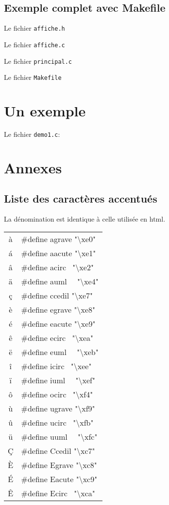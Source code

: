 \documentclass{report}
\newcommand\code[1]{
\begin{mdframed}[linecolor=purple,backgroundcolor=blue!10]
{\tt
#1
}
\end{mdframed}
}
\begin{document}
\section{Exemple complet avec Makefile}
Le fichier \texttt{affiche.h} \code{  }

Le fichier \texttt{affiche.c} \code{  }

Le fichier \texttt{principal.c} \code{  }

Le fichier \texttt{Makefile} \code{  }

\chapter{Un exemple}
Le fichier \texttt{demo1.c}:
\code{

}

\newcommand\letac[2]{\#define #1 "\textbackslash #2"\\}
\newcommand\letacfin[2]{\#define #1 "\textbackslash #2"}

\appendix
\chapter{Annexes}
\section{Liste des caractères accentués}
La dénomination est identique à celle utilisée en html.
\code{
\begin{tabular}{|c|l|}
\hline
à   & \letac{agrave}{xe0}
\'a & \letac{aacute}{xe1}
â   & \letac{acirc~}{xe2}
ä   & \letac{auml~~}{xe4}
ç   & \letac{ccedil}{xe7}
è   & \letac{egrave}{xe8}
é   & \letac{eacute}{xe9}
ê   & \letac{ecirc~}{xea}
ë   & \letac{euml~~}{xeb}
î   & \letac{icirc~}{xee}
ï   & \letac{iuml~~}{xef}
ô   & \letac{ocirc~}{xf4}
ù   & \letac{ugrave}{xf9}
û   & \letac{ucirc~}{xfb}
ü   & \letac{uuml~~}{xfc}
\c{C} & \letac{Ccedil}{xc7}
È   & \letac{Egrave}{xc8}
\'E & \letac{Eacute}{xc9}
Ê   & \letac{Ecirc~}{xca}
\hline
\end{tabular}
}
\end{document}
